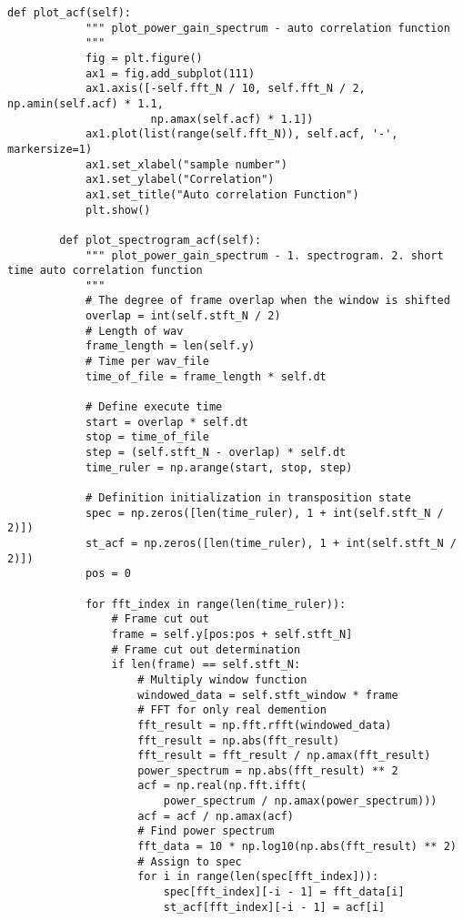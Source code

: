 \begin{lstlisting}[caption=plot\_tools.py,label=plot\_tools.py]
        def plot_acf(self):
            """ plot_power_gain_spectrum - auto correlation function
            """
            fig = plt.figure()
            ax1 = fig.add_subplot(111)
            ax1.axis([-self.fft_N / 10, self.fft_N / 2, np.amin(self.acf) * 1.1,
                      np.amax(self.acf) * 1.1])
            ax1.plot(list(range(self.fft_N)), self.acf, '-', markersize=1)
            ax1.set_xlabel("sample number")
            ax1.set_ylabel("Correlation")
            ax1.set_title("Auto correlation Function")
            plt.show()
    
        def plot_spectrogram_acf(self):
            """ plot_power_gain_spectrum - 1. spectrogram. 2. short time auto correlation function
            """
            # The degree of frame overlap when the window is shifted
            overlap = int(self.stft_N / 2)
            # Length of wav
            frame_length = len(self.y)
            # Time per wav_file
            time_of_file = frame_length * self.dt
    
            # Define execute time
            start = overlap * self.dt
            stop = time_of_file
            step = (self.stft_N - overlap) * self.dt
            time_ruler = np.arange(start, stop, step)
    
            # Definition initialization in transposition state
            spec = np.zeros([len(time_ruler), 1 + int(self.stft_N / 2)])
            st_acf = np.zeros([len(time_ruler), 1 + int(self.stft_N / 2)])
            pos = 0
    
            for fft_index in range(len(time_ruler)):
                # Frame cut out
                frame = self.y[pos:pos + self.stft_N]
                # Frame cut out determination
                if len(frame) == self.stft_N:
                    # Multiply window function
                    windowed_data = self.stft_window * frame
                    # FFT for only real demention
                    fft_result = np.fft.rfft(windowed_data)
                    fft_result = np.abs(fft_result)
                    fft_result = fft_result / np.amax(fft_result)
                    power_spectrum = np.abs(fft_result) ** 2
                    acf = np.real(np.fft.ifft(
                        power_spectrum / np.amax(power_spectrum)))
                    acf = acf / np.amax(acf)
                    # Find power spectrum
                    fft_data = 10 * np.log10(np.abs(fft_result) ** 2)
                    # Assign to spec
                    for i in range(len(spec[fft_index])):
                        spec[fft_index][-i - 1] = fft_data[i]
                        st_acf[fft_index][-i - 1] = acf[i]
    

\end{lstlisting}
